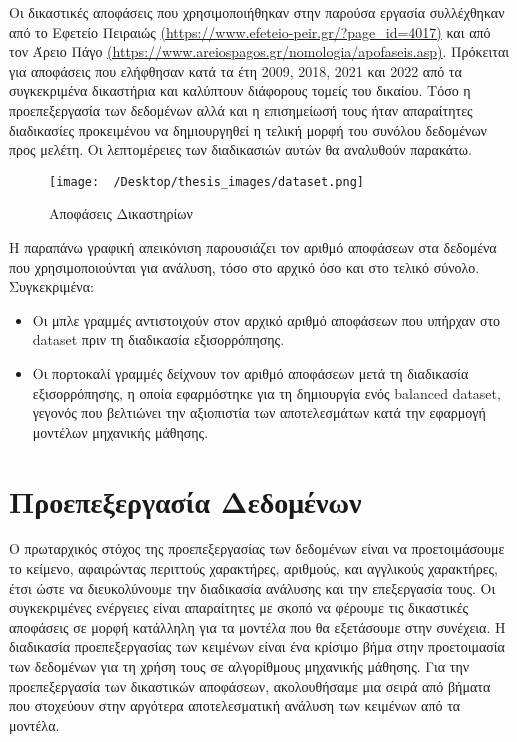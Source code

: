 \documentclass[diploma]{softlab-thesis}
\begin{document}
\sloppy
Οι δικαστικές αποφάσεις που χρησιμοποιήθηκαν στην παρούσα εργασία συλλέχθηκαν από το Εφετείο Πειραιώς \href{https://www.efeteio-peir.gr/?page\_id=4017}{(https://www.efeteio-peir.gr/?page\_id=4017)} και από τον Άρειο Πάγο \href{https://www.areiospagos.gr/nomologia/apofaseis.asp}{(https://www.areiospagos.gr/nomologia/apofaseis.asp)}. 
Πρόκειται για αποφάσεις που ελήφθησαν κατά τα έτη 2009, 2018, 2021 και 2022 από τα συγκεκριμένα δικαστήρια και καλύπτουν διάφορους τομείς του δικαίου. Τόσο η προεπεξεργασία των δεδομένων αλλά και η επισημείωσή τους ήταν απαραίτητες διαδικασίες προκειμένου να δημιουργηθεί η τελική μορφή του συνόλου δεδομένων προς μελέτη. Οι λεπτομέρειες των διαδικασιών αυτών θα αναλυθούν παρακάτω.

\begin{figure}[h]
    \centering
    \texttt{[image: ~/Desktop/thesis\_images/dataset.png]} %
    \caption{Αποφάσεις Δικαστηρίων}
    \label{fig:your_image_label}
\end{figure}

Η παραπάνω γραφική απεικόνιση παρουσιάζει τον αριθμό αποφάσεων στα δεδομένα που χρησιμοποιούνται για ανάλυση, τόσο στο αρχικό όσο και στο τελικό σύνολο. Συγκεκριμένα:

\begin{itemize}
\item Οι μπλε γραμμές αντιστοιχούν στον αρχικό αριθμό αποφάσεων που υπήρχαν στο dataset πριν τη διαδικασία εξισορρόπησης. 
\item Οι πορτοκαλί γραμμές δείχνουν τον αριθμό αποφάσεων μετά τη διαδικασία εξισορρόπησης, η οποία εφαρμόστηκε για τη δημιουργία ενός balanced dataset, γεγονός που βελτιώνει την αξιοπιστία των αποτελεσμάτων κατά την εφαρμογή μοντέλων μηχανικής μάθησης.
\end{itemize}


\section{Προεπεξεργασία Δεδομένων}

Ο πρωταρχικός στόχος της προεπεξεργασίας των δεδομένων είναι να προετοιμάσουμε το κείμενο, αφαιρώντας περιττούς χαρακτήρες, αριθμούς, και αγγλικούς χαρακτήρες, έτσι ώστε να διευκολύνουμε την διαδικασία ανάλυσης και την επεξεργασία τους. Οι συγκεκριμένες ενέργειες είναι απαραίτητες με σκοπό να φέρουμε τις δικαστικές αποφάσεις σε μορφή κατάλληλη για τα μοντέλα που θα εξετάσουμε στην συνέχεια. Η διαδικασία προεπεξεργασίας των κειμένων είναι ένα κρίσιμο βήμα στην προετοιμασία των δεδομένων για τη χρήση τους σε αλγορίθμους μηχανικής μάθησης. Για την προεπεξεργασία των δικαστικών αποφάσεων, ακολουθήσαμε μια σειρά από βήματα που στοχεύουν στην αργότερα αποτελεσματική ανάλυση των κειμένων από τα μοντέλα.
\end{document}
